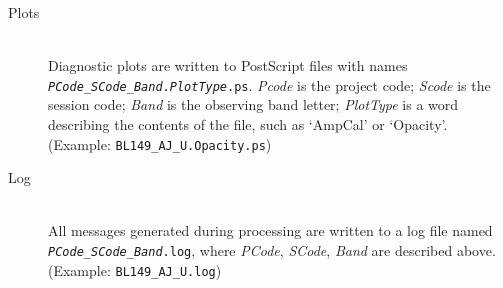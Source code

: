 \documentclass[10pt,onecolumn,final]{IEEEtran}
\begin{document}
\begin{description}

\item[Plots] \hfill \\  Diagnostic plots are written to PostScript files with names {\tt {\em PCode}\_{\em SCode}\_{\em Band}.{\em PlotType}.ps}.  {\em Pcode} is the project code; {\em Scode} is the session code; {\em Band} is the observing band letter; {\em PlotType} is a word describing the contents of the file, such as `AmpCal' or `Opacity'.  (Example: {\tt BL149\_AJ\_U.Opacity.ps}) 
 
\item[Log] \hfill \\ All messages generated during processing are written to a log file named {\tt {\em PCode}\_{\em SCode}\_{\em Band}.log}, where {\em PCode}, {\em SCode}, {\em Band} are described above.  (Example: {\tt BL149\_AJ\_U.log})

\end{description}






%
\end{document}
